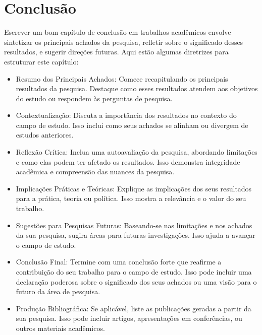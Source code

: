 
\chapter{Conclusão}\label{chap:conclusao}
	
	Escrever um bom capítulo de conclusão em trabalhos acadêmicos envolve sintetizar os principais achados da pesquisa, refletir sobre o significado desses resultados, e sugerir direções futuras. Aqui estão algumas diretrizes para estruturar este capítulo:

	\begin{itemize}
		\item Resumo dos Principais Achados: Comece recapitulando os principais resultados da pesquisa. Destaque como esses resultados atendem aos objetivos do estudo ou respondem às perguntas de pesquisa.
		
		\item Contextualização: Discuta a importância dos resultados no contexto do campo de estudo. Isso inclui como seus achados se alinham ou divergem de estudos anteriores.
		
		\item Reflexão Crítica: Inclua uma autoavaliação da pesquisa, abordando limitações e como elas podem ter afetado os resultados. Isso demonstra integridade acadêmica e compreensão das nuances da pesquisa.
		
		\item Implicações Práticas e Teóricas: Explique as implicações dos seus resultados para a prática, teoria ou política. Isso mostra a relevância e o valor do seu trabalho.
		
		\item Sugestões para Pesquisas Futuras: Baseando-se nas limitações e nos achados da sua pesquisa, sugira áreas para futuras investigações. Isso ajuda a avançar o campo de estudo.
		
		\item Conclusão Final: Termine com uma conclusão forte que reafirme a contribuição do seu trabalho para o campo de estudo. Isso pode incluir uma declaração poderosa sobre o significado dos seus achados ou uma visão para o futuro da área de pesquisa.
		
		\item Produção Bibliográfica: Se aplicável, liste as publicações geradas a partir da sua pesquisa. Isso pode incluir artigos, apresentações em conferências, ou outros materiais acadêmicos.
	\end{itemize}
